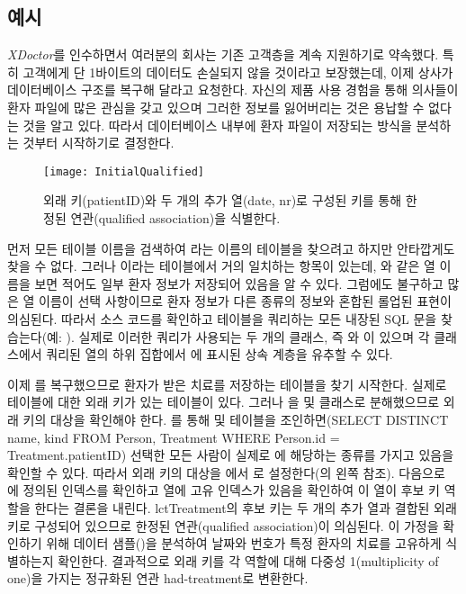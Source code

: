 \documentclass[a4paper,10pt,twoside]{book}
\begin{document}
\subsection*{예시}

\emph{XDoctor}를 인수하면서 여러분의 회사는 기존 고객층을 계속 지원하기로 약속했다. 특히 고객에게 단 1바이트의 데이터도 손실되지 않을 것이라고 보장했는데, 이제 상사가 데이터베이스 구조를 복구해 달라고 요청한다. 자신의 제품 사용 경험을 통해 의사들이 환자 파일에 많은 관심을 갖고 있으며 그러한 정보를 잃어버리는 것은 용납할 수 없다는 것을 알고 있다. 따라서 데이터베이스 내부에 환자 파일이 저장되는 방식을 분석하는 것부터 시작하기로 결정한다.

\begin{figure}
\begin{center}
\texttt{[image: InitialQualified]}
\caption{외래 키(patientID)와 두 개의 추가 열(date, nr)로 구성된 키를 통해 한정된 연관(qualified association)을 식별한다.}
\end{center}
\end{figure}

먼저 모든 테이블 이름을 검색하여 라는 이름의 테이블을 찾으려고 하지만 안타깝게도 찾을 수 없다. 그러나 이라는 테이블에서 거의 일치하는 항목이 있는데, 와 같은 열 이름을 보면 적어도 일부 환자 정보가 저장되어 있음을 알 수 있다. 그럼에도 불구하고 많은 열 이름이 선택 사항이므로 환자 정보가 다른 종류의 정보와 혼합된 롤업된 표현이 의심된다. 따라서 소스 코드를 확인하고  테이블을 쿼리하는 모든 내장된 SQL 문을 찾습는다(예: ). 실제로 이러한 쿼리가 사용되는 두 개의 클래스, 즉 와 이 있으며 각 클래스에서 쿼리된 열의 하위 집합에서 에 표시된 상속 계층을 유추할 수 있다.

이제 를 복구했으므로 환자가 받은 치료를 저장하는 테이블을 찾기 시작한다. 실제로  테이블에 대한 외래 키가 있는  테이블이 있다. 그러나 을  및  클래스로 분해했으므로 외래 키의 대상을 확인해야 한다. 를 통해  및  테이블을 조인하면(SELECT DISTINCT name, kind FROM Person, Treatment WHERE Person.id = Treatment.patientID) 선택한 모든 사람이 실제로 에 해당하는 종류를 가지고 있음을 확인할 수 있다. 따라서 외래 키의 대상을 에서 로 설정한다(의 왼쪽 참조). 다음으로 에 정의된 인덱스를 확인하고  열에 고유 인덱스가 있음을 확인하여 이 열이 후보 키 역할을 한다는 결론을 내린다. lct{Treatment}의 후보 키는 두 개의 추가 열과 결합된 외래 키로 구성되어 있으므로 한정된 연관(qualified association)이 의심된다. 이 가정을 확인하기 위해 데이터 샘플()을 분석하여 날짜와 번호가 특정 환자의 치료를 고유하게 식별하는지 확인한다. 결과적으로 외래 키를 각 역할에 대해 다중성 1(multiplicity of one)을 가지는 정규화된 연관 had-treatment로 변환한다.
\end{document}
